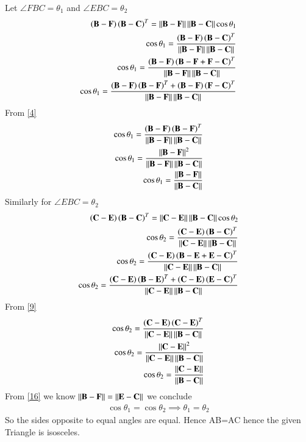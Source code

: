 \documentclass[journal,12pt,twocolumn]{IEEEtran}
\begin{document}
Let $\angle FBC=\theta_1$  and  $\angle EBC=\theta_2$
    \begin{align}
        \left(\mathbf{B}-\mathbf{F}\right)\left(\mathbf{B}-\mathbf{C}\right)^T=\left\lVert\mathbf{B}-\mathbf{F}\right\rVert\left\lVert\mathbf{B}-\mathbf{C}\right\rVert\cos\theta_1\\
        \cos{\theta_1}=\frac{\left(\mathbf{B}-\mathbf{F}\right)\left(\mathbf{B}-\mathbf{C}\right)^T}{\left\lVert\mathbf{B}-\mathbf{F}\right\rVert\left\lVert\mathbf{B}-\mathbf{C}\right\rVert}\\
        \cos{\theta_1}=\frac{\left(\mathbf{B}-\mathbf{F}\right)\left(\mathbf{B}-\mathbf{F}+\mathbf{F}-\mathbf{C}\right)^T}{\left\lVert\mathbf{B}-\mathbf{F}\right\rVert\left\lVert\mathbf{B}-\mathbf{C}\right\rVert}\\
        \cos{\theta_1}=\frac{\left(\mathbf{B}-\mathbf{F}\right)\left(\mathbf{B}-\mathbf{F}\right)^T +\left(\mathbf{B}-\mathbf{F}\right)\left(\mathbf{F}-\mathbf{C}\right)^T}{\left\lVert\mathbf{B}-\mathbf{F}\right\rVert\left\lVert\mathbf{B}-\mathbf{C}\right\rVert}
        \end{align}
        From \eqref{4}
        \begin{align}
          \cos{\theta_1}=\frac{\left(\mathbf{B}-\mathbf{F}\right)\left(\mathbf{B}-\mathbf{F}\right)^T}{\left\lVert\mathbf{B}-\mathbf{F}\right\rVert\left\lVert\mathbf{B}-\mathbf{C}\right\rVert} \\
          \cos{\theta_1}=\frac{\left\lVert\mathbf{B}-\mathbf{F}\right\rVert^2}{\left\lVert\mathbf{B}-\mathbf{F}\right\rVert\left\lVert\mathbf{B}-\mathbf{C}\right\rVert}\\
          \cos{\theta_1}=\frac{\left\lVert\mathbf{B}-\mathbf{F}\right\rVert}{\left\lVert\mathbf{B}-\mathbf{C}\right\rVert}
        \end{align}
        Similarly for $\angle EBC=\theta_2$
       \begin{align}
        \left(\mathbf{C}-\mathbf{E}\right)\left(\mathbf{B}-\mathbf{C}\right)^T=\left\lVert\mathbf{C}-\mathbf{E}\right\rVert\left\lVert\mathbf{B}-\mathbf{C}\right\rVert\cos\theta_2\\
        \cos{\theta_2}=\frac{\left(\mathbf{C}-\mathbf{E}\right)\left(\mathbf{B}-\mathbf{C}\right)^T}{\left\lVert\mathbf{C}-\mathbf{E}\right\rVert\left\lVert\mathbf{B}-\mathbf{C}\right\rVert}\\
        \cos{\theta_2}=\frac{\left(\mathbf{C}-\mathbf{E}\right)\left(\mathbf{B}-\mathbf{E}+\mathbf{E}-\mathbf{C}\right)^T}{\left\lVert\mathbf{C}-\mathbf{E}\right\rVert\left\lVert\mathbf{B}-\mathbf{C}\right\rVert}\\
        \cos{\theta_2}=\frac{\left(\mathbf{C}-\mathbf{E}\right)\left(\mathbf{B}-\mathbf{E}\right)^T +\left(\mathbf{C}-\mathbf{E}\right)\left(\mathbf{E}-\mathbf{C}\right)^T}{\left\lVert\mathbf{C}-\mathbf{E}\right\rVert\left\lVert\mathbf{B}-\mathbf{C}\right\rVert}
        \end{align}
        From {\eqref{9}}
        \begin{align}
          \cos{\theta_2}=\frac{\left(\mathbf{C}-\mathbf{E}\right)\left(\mathbf{C}-\mathbf{E}\right)^T}{\left\lVert\mathbf{C}-\mathbf{E}\right\rVert\left\lVert\mathbf{B}-\mathbf{C}\right\rVert} \\
          \cos{\theta_2}=\frac{\left\lVert\mathbf{C}-\mathbf{E}\right\rVert^2}{\left\lVert\mathbf{C}-\mathbf{E}\right\rVert\left\lVert\mathbf{B}-\mathbf{C}\right\rVert}\\
          \cos{\theta_2}=\frac{\left\lVert\mathbf{C}-\mathbf{E}\right\rVert}{\left\lVert\mathbf{B}-\mathbf{C}\right\rVert}
        \end{align}
        From \eqref{16} we know $\left\lVert\mathbf{B}-\mathbf{F}\right\rVert=\left\lVert\mathbf{E}-\mathbf{C}\right\rVert$ we conclude
        \begin{align}
            \cos\theta_1=\cos\theta_2
            \implies\theta_1=\theta_2
        \end{align}
        So the sides opposite to equal angles are equal. Hence AB=AC hence the given Triangle is isosceles.
    
\end{document}
